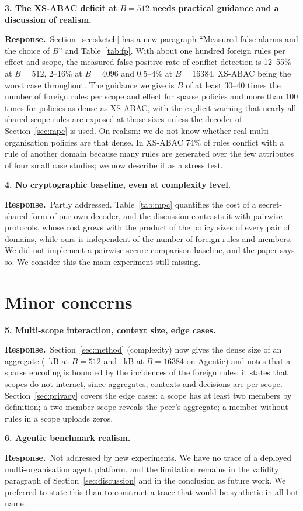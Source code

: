 \documentclass[11pt,a4paper]{article}
\newcommand{\concern}[2]{\medskip\noindent\textbf{#1}\quad\emph{#2}\par\smallskip}
\newcommand{\resp}{\noindent\textcolor{blue!55!black}{\textbf{Response.}}\ }
\begin{document}
\concern{3. The XS-ABAC deficit at $B=512$ needs practical guidance and a discussion of realism.}{}
\resp Section~\ref{sec:sketch} has a new paragraph ``Measured false alarms and the choice of $B$'' and Table~\ref{tab:fp}. With about one hundred foreign rules per effect and scope, the measured false-positive rate of conflict detection is 12--55\% at $B=512$, 2--16\% at $B=4096$ and 0.5--4\% at $B=16384$, XS-ABAC being the worst case throughout. The guidance we give is $B$ of at least 30--40 times the number of foreign rules per scope and effect for sparse policies and more than 100 times for policies as dense as XS-ABAC, with the explicit warning that nearly all shared-scope rules are exposed at those sizes unless the decoder of Section~\ref{sec:mpc} is used. On realism: we do not know whether real multi-organisation policies are that dense. In XS-ABAC 74\% of rules conflict with a rule of another domain because many rules are generated over the few attributes of four small case studies; we now describe it as a stress test.

\concern{4. No cryptographic baseline, even at complexity level.}{}
\resp Partly addressed. Table~\ref{tab:mpc} quantifies the cost of a secret-shared form of our own decoder, and the discussion contrasts it with pairwise protocols, whose cost grows with the product of the policy sizes of every pair of domains, while ours is independent of the number of foreign rules and members. We did not implement a pairwise secure-comparison baseline, and the paper says so. We consider this the main experiment still missing.

\section*{Minor concerns}

\concern{5. Multi-scope interaction, context size, edge cases.}{}
\resp Section~\ref{sec:method} (complexity) now gives the dense size of an aggregate (\skagenticdensekBdxii~kB at $B=512$ and \skagenticdensekBsixteenk~kB at $B=16384$ on Agentic) and notes that a sparse encoding is bounded by the incidences of the foreign rules; it states that scopes do not interact, since aggregates, contexts and decisions are per scope. Section~\ref{sec:privacy} covers the edge cases: a scope has at least two members by definition; a two-member scope reveals the peer's aggregate; a member without rules in a scope uploads zeros.

\concern{6. Agentic benchmark realism.}{}
\resp Not addressed by new experiments. We have no trace of a deployed multi-organisation agent platform, and the limitation remains in the validity paragraph of Section~\ref{sec:discussion} and in the conclusion as future work. We preferred to state this than to construct a trace that would be synthetic in all but name.
\end{document}
